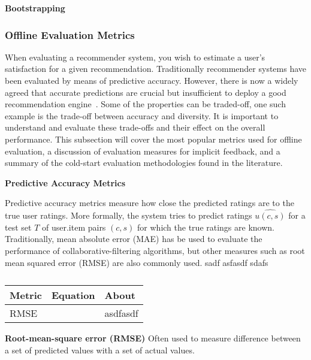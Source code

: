 
\textbf{Bootstrapping}



\subsubsection{Offline Evaluation Metrics}

When evaluating a recommender system, you wish to estimate a user's
satisfaction for a given recommendation. Traditionally recommender systems have
been evaluated by means of predictive accuracy. However, there is now a widely
agreed that accurate predictions are crucial but insufficient to deploy a good
recommendation engine~\cite{Shani2011, McNee2006}. Some of the properties can
be traded-off, one such example is the trade-off between accuracy and
diversity. It is important to understand and evaluate these trade-offs and
their effect on the overall performance. This subsection will cover the most
popular metrics used for offline evaluation, a discussion of evaluation
measures for implicit feedback, and a summary of the cold-start evaluation
methodologies found in the literature.

\textbf{Predictive Accuracy Metrics}

Predictive accuracy metrics measure how close the predicted ratings are to the
true user ratings. More formally, the system tries to predict ratings
$\hat{u(c,s)}$ for a test set $T$ of user.item pairs $(c, s)$ for which the
true ratings are known. Traditionally, mean absolute error (MAE) has be used to
evaluate the performance of collaborative-filtering algorithms, but other
measures such as root mean squared error (RMSE) are also commonly used.
sadf
\equationMEA
asfasdf
sdafs

\begin{table}[H]
    \centering
    \begin{tabular}{l|l|l}
    	\textbf{Metric}	& \textbf{Equation} & \textbf{About} \\ \hline
    	RMSE 			& \parbox{6cm}{\equationRMSE}
    	 & asdfasdf \\
    \end{tabular}
    \label{table:predictiveAccuracyMetrics}
    \caption [Predictive Accuracy Metrics]{}
\end{table}


\textbf{Root-mean-square error (RMSE)}
Often used to measure difference between a set of predicted values with a set of actual values.


